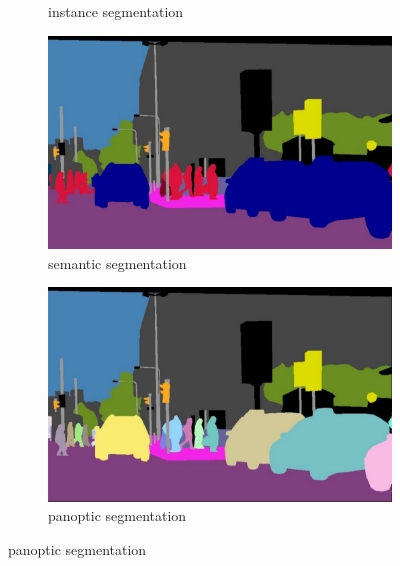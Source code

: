 \begin{figure}[H]
\begin{subfigure}{0.328\textwidth}
        \caption{instance segmentation}
        \label{fig:differentApproaches_instance_segmentation}
    \end{subfigure}

    \vspace{0.1cm} %

    \begin{subfigure}{0.328\textwidth}
        \includegraphics[width=\linewidth]{PICs/differentApproaches/semantic_segmentation.jpg}
        \caption{semantic segmentation}
        \label{fig:differentApproaches_semantic_segmentation}
    \end{subfigure}
    \hfill
    \begin{subfigure}{0.328\textwidth}
        \includegraphics[width=\linewidth]{PICs/differentApproaches/panoptic_segmentation.jpg}
        \caption{panoptic segmentation}
        \label{fig:differentApproaches_panoptic_segmentation}
    \end{subfigure}

\end{figure}
